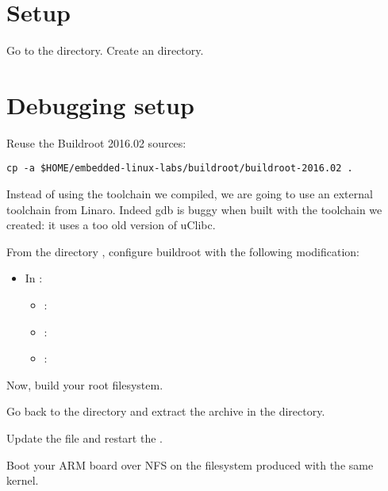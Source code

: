 
\section{Setup}

Go to the  directory.
Create an  directory.

\section{Debugging setup}

Reuse the Buildroot 2016.02 sources:
\begin{verbatim}
cp -a $HOME/embedded-linux-labs/buildroot/buildroot-2016.02 .
\end{verbatim}
Instead of using the toolchain we compiled, we are going to use an
external toolchain from Linaro. Indeed gdb is buggy when built with
the toolchain we created: it uses a too old version of uClibc.

From the directory
,
configure buildroot with the following modification:

\begin{itemize}
\item In :
   \begin{itemize}
   \item {}: 
   \item {}: 
   \item {}: 
   \end{itemize}
\end{itemize}

Now, build your root filesystem.

Go back to the  directory
and extract the 
archive in the  directory.

Update the  file and restart the
.

Boot your ARM board over NFS on the filesystem produced with the same
kernel.

